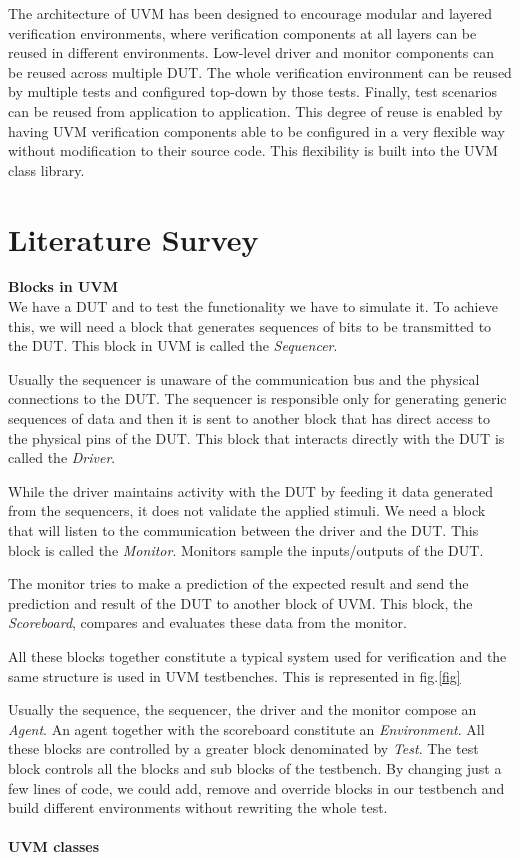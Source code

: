 \documentclass[a4paper,11pt]{article}
\begin{document}
The architecture of UVM has been designed to encourage modular and layered verification environments, where verification components at all layers can be reused in different environments. Low-level driver and monitor components can be reused across multiple DUT. The whole verification environment can be reused by multiple tests and configured top-down by those tests. Finally, test scenarios can be reused from application to application. This degree of reuse is enabled by having UVM verification components able to be configured in a very flexible way without modification to their source code. This flexibility is built into the UVM class library.

\newpage
\pagebreak
\section{Literature Survey}

\textbf{Blocks in UVM}
\ \\
We have a DUT and to test the functionality we have to simulate it. To achieve this, we will need a block that generates sequences of bits to be transmitted to the DUT. This block in UVM is called the \textit{Sequencer}. 

Usually the sequencer is unaware of the communication bus and the physical connections to the DUT. The sequencer is responsible only for generating generic sequences of data and then it is sent to another block that has direct access to the physical pins of the DUT. This block that interacts directly with the DUT is called the \textit{Driver}.

While the driver maintains activity with the DUT by feeding it data generated from the sequencers, it does not validate the applied stimuli. We need a block that will listen to the communication between the driver and the DUT. This block is called the \textit{Monitor}. Monitors sample the inputs/outputs of the DUT.

The monitor tries to make a prediction of the expected result and send the prediction and result of the DUT to another block of UVM. This block, the \textit{Scoreboard}, compares and evaluates these data from the monitor.

All these blocks together constitute a typical system used for verification and the same structure is used in UVM testbenches. This is represented in fig.\ref{fig}

Usually the sequence, the sequencer, the driver and the monitor compose an \textit{Agent}. An agent together with the scoreboard constitute an \textit{Environment}. All these blocks are controlled by a greater block denominated by \textit{Test}. The test block controls all the blocks and sub blocks of the testbench. By changing just a few lines of code, we could add, remove and override blocks in our testbench and build different environments without rewriting the whole test.
\ \\
\ \\
\textbf{UVM classes}
\ \\
\end{document}
